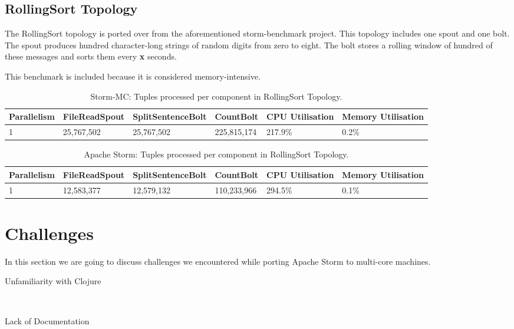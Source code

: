 \subsection{RollingSort Topology}

The RollingSort topology is ported over from the aforementioned storm-benchmark project. This topology includes one spout and one bolt. The spout produces hundred character-long strings of random digits from zero to eight. The bolt stores a rolling window of hundred of these messages and sorts them every \textbf{x} seconds.

This benchmark is included because it is considered memory-intensive.


\medskip
\begin{table}
\begin{adjustwidth}{-0.5in}{-0.5in}
\centering
\small
\begin{tabular}{@{}llllll@{}}
    {Parallelism} & {FileReadSpout} & {SplitSentenceBolt} & {CountBolt} & {CPU Utilisation} & {Memory Utilisation} \\ \toprule
    1 & {25,767,502} & {25,767,502} & {225,815,174} & {217.9\%} & {0.2\%} \\
\end{tabular}
\caption{Storm-MC: Tuples processed per component in RollingSort Topology.}
\end{adjustwidth}
\label{table:storm_mc_rolling}
\end{table}
\medskip

\medskip
\begin{table}
\begin{adjustwidth}{-0.5in}{-0.5in}
\centering
\small
\begin{tabular}{@{}llllll@{}}
    {Parallelism} & {FileReadSpout} & {SplitSentenceBolt} & {CountBolt} & {CPU Utilisation} & {Memory Utilisation} \\ \toprule
    1 & {12,583,377} & {12,579,132} & {110,233,966} & {294.5\%} & {0.1\%} \\
\end{tabular}
\caption{Apache Storm: Tuples processed per component in RollingSort Topology.}
\end{adjustwidth}
\label{table:storm_rolling}
\end{table}
\medskip



\section{Challenges}
\label{sec:challenges}

In this section we are going to discuss challenges we encountered while porting Apache Storm to multi-core machines.

\begin{description}
	\item[Unfamiliarity with Clojure] \hfill \\
	
	\item[Lack of Documentation] \hfill \\
	
\end{description}

